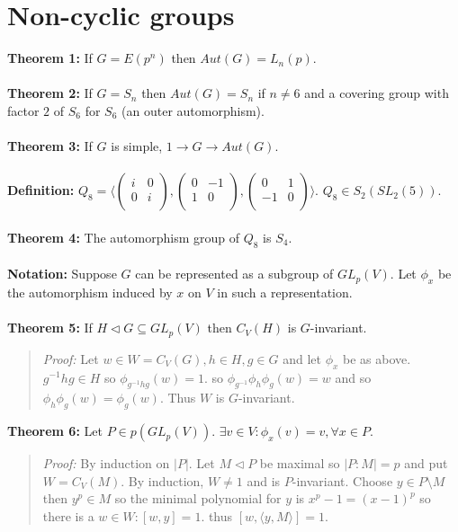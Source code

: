\section {Non-cyclic groups}
{\bf Theorem 1:}
If $G= E(p^n)$ then $Aut(G)= L_n(p)$.
\\
\\
{\bf Theorem 2:}
If $G= S_n$ then $Aut(G)= S_n$ if $n \ne 6$ and a covering group with factor $2$ of $S_6$ for
$S_6$ (an outer automorphism).
\\
\\
{\bf Theorem 3:}
If $G$ is simple, $1 \rightarrow G \rightarrow Aut(G)$.
\\
\\
{\bf Definition:} $Q_8 =
\langle
\left(\begin{array} {cc}
i & 0\\
0 & i\\
\end{array}\right),
\left(\begin{array} {cc}
0 & -1\\
1 & 0\\
\end{array}\right),
\left(\begin{array} {cc}
0 & 1\\
-1 & 0\\
\end{array}\right)
\rangle$. $Q_8 \in S_2(SL_2(5))$.
\\
\\
{\bf Theorem 4:}  The automorphism group of $Q_8$ is $S_4$.
\\
\\
{\bf Notation:} Suppose $G$ can be represented as a subgroup of $GL_p(V)$.
Let $\phi_{x}$ be the automorphism induced by $x$ on $V$ in such a representation.
\\
\\
{\bf Theorem 5:} If $H \lhd G \subseteq GL_p(V)$ then $C_V(H)$ is $G$-invariant.
\begin{quote}
\emph{Proof:}
Let $w \in W = C_V(G), h \in H, g \in G$ and let $\phi_{x}$ be as above.
$g^{-1} h g \in H$ so $\phi_{g^{-1} h g}(w) = 1$.
so $\phi_{g^{-1}} \phi_{h} \phi_{g} (w) = w$ and so $\phi_{h} \phi_{g} (w) = \phi_{g} (w)$.
Thus $W$ is $G$-invariant.
\end{quote}
{\bf Theorem 6:} Let $P \in p(GL_p(V))$.  $\exists v \in V: \phi_{x}(v)= v, \forall x \in P$.
\begin{quote}
\emph{Proof:}
By induction on $|P|$.  Let $M \lhd P$ be maximal so $|P:M|=p$ and put $W=C_V(M)$.
By induction, $W \ne 1$ and is $P$-invariant.  Choose $y \in P \setminus M$ then
$y^p \in M$ so the minimal polynomial for $y$ is $x^p-1 = (x-1)^p$ so there is a $w \in W: [w,y]=1$.
thus $[w, \langle y, M \rangle ] = 1$.
\end{quote}
